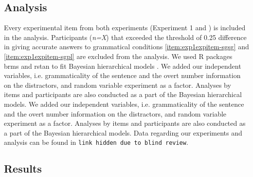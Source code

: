 \documentclass[a4paper,man,natbib]{apa6}\usepackage[]{graphicx}\usepackage[]{color}
\begin{document}
\subsection{Analysis} \label{sec:exp1:analysis}

Every experimental item from both experiments (Experiment 1 and \citet{LagoEtAl:2018}) is included in the analysis. Participants (\textit{n=X}) that exceeded the threshold of 0.25 difference in giving accurate answers to grammatical conditions \ref{item:exp1expitem-sgsg} and \ref{item:exp1expitem-sgpl} are excluded from the analysis. We used R packages brms \citep{R-brms_b} and rstan \citep{R-stan} to fit Bayesian hierarchical models \citep{GelmanHill:2007}. We added our independent variables, i.e. grammaticality of the sentence and the overt number information on the distractors, and random variable experiment as a factor. Analyses by items and participants are also conducted as a part of the Bayesian hierarchical models. We added our independent variables, i.e. grammaticality of the sentence and the overt number information on the distractors, and random variable experiment as a factor. Analyses by items and participants are also conducted as a part of the Bayesian hierarchical models.
Data regarding our experiments and analysis can be found in \texttt{link hidden due to blind review}.




\subsection{Results} \label{sec:exp1:results}
\end{document}

